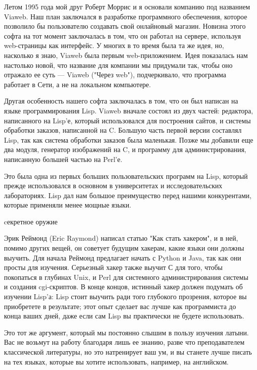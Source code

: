 \documentclass[ebook,12pt,oneside,openany]{memoir}
\begin{document}
\maketitle

Летом 1995 года мой друг Роберт Моррис и я основали компанию под
названием Viaweb. Наш план заключался в разработке программного
обеспечения, которое позволило бы пользователю создавать свой
онлайновый магазин. Новизна этого софта на тот момент заключалась в
том, что он работал на сервере, используя web-страницы как интерфейс.
У многих в то время была та же идея, но, насколько я знаю, Viaweb была
первым web-приложением. Идея показалась нам настолько новой, что
название для компании мы придумали так, чтобы оно отражало ее суть —
Viaweb ("Через web"), подчеркивало, что программа работает в Сети, а
не на локальном компьютере.

Другая особенность нашего софта заключалась в том, что он был написан
на языке программирования Lisp. Viaweb вначале состоял из двух частей:
редактора, написанного на Lisp'е, который использовался для построения
сайтов, и системы обработки заказов, написанной на C. Большую часть
первой версии составлял Lisp, так как система обработки заказов была
маленькая. Позже мы добавили еще два модуля, генератор изображений на
C, и программу для администрирования, написанную большей частью на
Perl'е.

Это была одна из первых больших пользовательских программ на Lisp,
который прежде использовался в основном в университетах и
исследовательских лабораториях. Lisp дал нам большое преимущество
перед нашими конкурентами, которые применяли менее мощные языки.

cекретное оружие

Эрик Реймонд (Eric Raymond) написал статью "Как стать хакером", и в
ней, помимо других вещей, он советует будущим хакерам, какие языки они
должны выучить. Для начала Реймонд предлагает начать с Python и Java,
так как они просты для изучения. Серьезный хакер также выучит С для
того, чтобы покопаться в глубинах Unix, и Perl для системного
администрирования системы и создания cgi-скриптов. В конце концов,
истинный хакер должен подумать об изучении Lisp'а: Lisp стоит выучить
ради того глубокого прозрения, которое вы приобретете в результате;
этот опыт сделает вас лучше как программиста до конца ваших дней, даже
если сам Lisp вы практически не будете использовать.

Это тот же аргумент, который мы постоянно слышим в пользу изучения
латыни. Вас не возьмут на работу благодаря лишь ее знанию, разве что
преподавателем классической литературы, но это натренирует ваш ум, и
вы станете лучше писать на тех языках, которые вы хотите использовать,
например, на английском.
\end{document}
